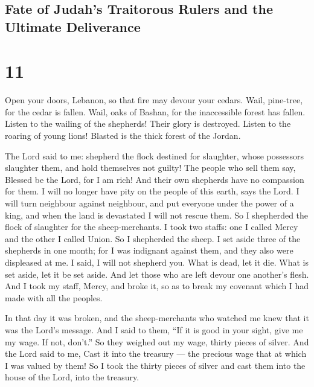 \hypertarget{fate-of-judahs-traitorous-rulers-and-the-ultimate-deliverance}{%
\subsection{Fate of Judah's Traitorous Rulers and the Ultimate
Deliverance}\label{fate-of-judahs-traitorous-rulers-and-the-ultimate-deliverance}}

\hypertarget{section-10}{%
\section{11}\label{section-10}}

 Open your doors, Lebanon, so that fire may devour your
cedars.  Wail, pine-tree, for the cedar is fallen. Wail,
oaks of Bashan, for the inaccessible forest has fallen. 
Listen to the wailing of the shepherds! Their glory is destroyed. Listen
to the roaring of young lions! Blasted is the thick forest of the
Jordan.

 The Lord said to me: shepherd the flock destined for
slaughter,  whose possessors slaughter them, and hold
themselves not guilty! The people who sell them say, Blessed be the
Lord, for I am rich! And their own shepherds have no compassion for
them.  I will no longer have pity on the people of this
earth, says the Lord. I will turn neighbour against neighbour, and put
everyone under the power of a king, and when the land is devastated I
will not rescue them.  So I shepherded the flock of
slaughter for the sheep-merchants. I took two staffs: one I called Mercy
and the other I called Union. So I shepherded the sheep.  I
set aside three of the shepherds in one month; for I was indignant
against them, and they also were displeased at me.  I said,
I will not shepherd you. What is dead, let it die. What is set aside,
let it be set aside. And let those who are left devour one another's
flesh.  And I took my staff, Mercy, and broke it, so as to
break my covenant which I had made with all the peoples.

 In that day it was broken, and the sheep-merchants who
watched me knew that it was the Lord's message.  And I said
to them, ``If it is good in your sight, give me my wage. If not,
don't.'' So they weighed out my wage, thirty pieces of silver.
 And the Lord said to me, Cast it into the treasury --- the
precious wage that at which I was valued by them! So I took the thirty
pieces of silver and cast them into the house of the Lord, into the
treasury.

